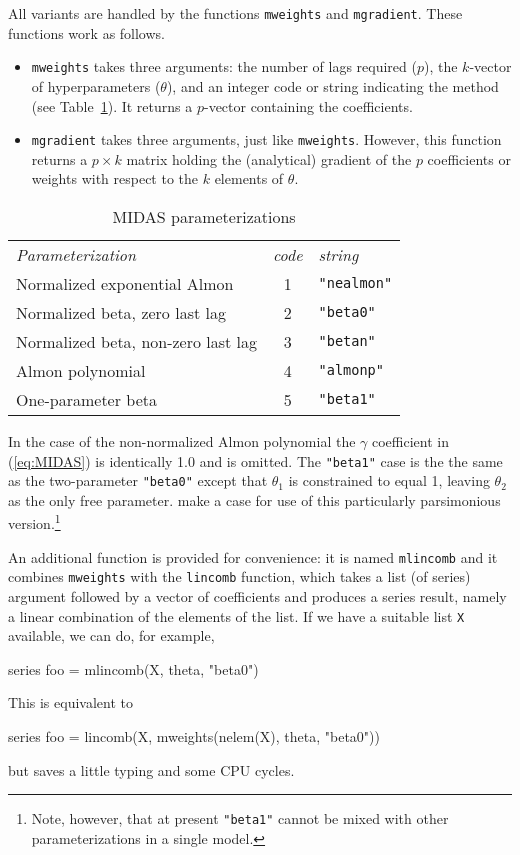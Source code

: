 All variants are handled by the functions \texttt{mweights} and
\texttt{mgradient}. These functions work as follows.
\begin{itemize}
\item \texttt{mweights} takes three arguments: the number of lags
  required ($p$), the $k$-vector of hyperparameters ($\theta$), and an
  integer code or string indicating the method (see
  Table~\ref{tab:midas-parm}). It returns a $p$-vector containing the
  coefficients.
\item \texttt{mgradient} takes three arguments, just like
  \texttt{mweights}. However, this function returns a $p \times k$
  matrix holding the (analytical) gradient of the $p$ coefficients or
  weights with respect to the $k$ elements of $\theta$.
\end{itemize}

\begin{table}[htbp]
  \centering
  \begin{tabular}{lcl}
    \textit{Parameterization} & 
      \textit{code} & \textit{string} \\[4pt]
    Normalized exponential Almon & 1 & \verb|"nealmon"| \\
    Normalized beta, zero last lag & 2 & \verb|"beta0"| \\
    Normalized beta, non-zero last lag & 3 & \verb|"betan"| \\
    Almon polynomial & 4 & \verb|"almonp"| \\
    One-parameter beta & 5 & \verb|"beta1"|
  \end{tabular}
  \caption{MIDAS parameterizations}
  \label{tab:midas-parm}
\end{table}
In the case of the non-normalized Almon polynomial the $\gamma$
coefficient in (\ref{eq:MIDAS}) is identically 1.0 and is omitted.
The \verb|"beta1"| case is the the same as the two-parameter
\verb|"beta0"| except that $\theta_1$ is constrained to equal 1,
leaving $\theta_2$ as the only free parameter. \cite{ghysels-qian16}
make a case for use of this particularly parsimonious
version.\footnote{Note, however, that at present \verb|"beta1"| cannot
  be mixed with other parameterizations in a single model.}

An additional function is provided for convenience: it is named
\texttt{mlincomb} and it combines \texttt{mweights} with the
\texttt{lincomb} function, which takes a list (of series) argument
followed by a vector of coefficients and produces a series result,
namely a linear combination of the elements of the list. If we have a
suitable list \texttt{X} available, we can do, for example,
\begin{code}
series foo = mlincomb(X, theta, "beta0")
\end{code}
This is equivalent to
\begin{code}
series foo = lincomb(X, mweights(nelem(X), theta, "beta0"))
\end{code}
but saves a little typing and some CPU cycles.

